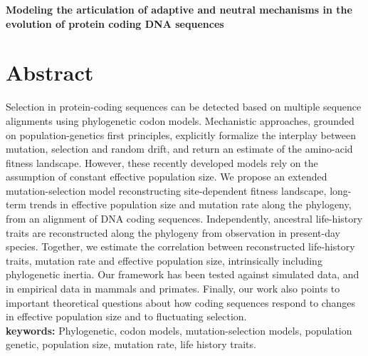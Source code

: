 \thispagestyle{empty}


\begin{center}
	\LARGE \textbf{Modeling the articulation of adaptive and neutral mechanisms in the evolution of protein coding DNA sequences}
\end{center}

\section*{Abstract}
Selection in protein-coding sequences can be detected based on multiple sequence alignments using phylogenetic codon models.
Mechanistic approaches, grounded on population-genetics first principles, explicitly formalize the interplay between mutation, selection and random drift, and return an estimate of the amino-acid fitness landscape.
However, these recently developed models rely on the assumption of constant effective population size.
We propose an extended mutation-selection model reconstructing site-dependent fitness landscape, long-term trends in effective population size and mutation rate along the phylogeny, from an alignment of DNA coding sequences.
Independently, ancestral life-history traits are reconstructed along the phylogeny from observation in present-day species.
Together, we estimate the correlation between reconstructed life-history traits, mutation rate and effective population size, intrinsically including phylogenetic inertia.
Our framework has been tested against simulated data, and in empirical data in mammals and primates.
Finally, our work also points to important theoretical questions about how coding sequences respond to changes in effective population size and to fluctuating selection.\\

\textbf{keywords: }{Phylogenetic, codon models, mutation-selection models, population genetic, population size, mutation rate, life history traits.}

\newpage
